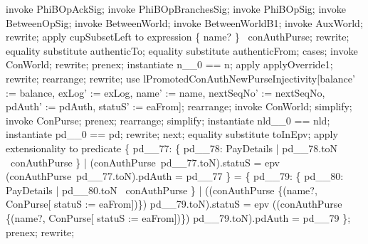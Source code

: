 \begin{LPScript}\begin{zproof}[lPromotedAuxWorldAckType]
    invoke PhiBOpAckSig;
    invoke PhiBOpBranchesSig;
    invoke PhiBOpSig;
    invoke BetweenOpSig;
    invoke BetweenWorld;
    invoke BetweenWorldB1;
    invoke AuxWorld;
    rewrite;
    apply cupSubsetLeft to expression \{ name? \} \cup \dom~conAuthPurse;
    rewrite;
    equality substitute authenticTo;
    equality substitute authenticFrom;
    cases;
        invoke ConWorld;
        rewrite;
        prenex;
        instantiate n\_\_0 == n;
        apply applyOverride1;
        rewrite;
        rearrange;
        rewrite;
        use lPromotedConAuthNewPurseInjectivity[balance' := balance,
            exLog' := exLog, name' := name, nextSeqNo' := nextSeqNo,
            pdAuth' := pdAuth, statuS' := eaFrom];
        rearrange;
        invoke ConWorld;
        simplify;
        invoke ConPurse;
        prenex;
        rearrange;
        simplify;
        instantiate nld\_\_0 == nld;
        instantiate pd\_\_0 == pd;
        rewrite;
    next;
        equality substitute toInEpv;
        apply extensionality to predicate
            \{ pd\_\_77: \{ pd\_\_78: PayDetails | pd\_\_78.toN \in \dom~conAuthPurse \}
              | (conAuthPurse~pd\_\_77.toN).statuS = epv
             \land (conAuthPurse~pd\_\_77.toN).pdAuth = pd\_\_77 \}
            = \{ pd\_\_79: \{ pd\_\_80: PayDetails | pd\_\_80.toN \in \dom~conAuthPurse \}
              | ((conAuthPurse \oplus \{(name?, \theta ConPurse[
                    statuS := eaFrom])\}) pd\_\_79.toN).statuS = epv
              \land ((conAuthPurse \oplus \{(name?, \theta ConPurse[
                    statuS := eaFrom])\}) pd\_\_79.toN).pdAuth = pd\_\_79 \};
        prenex;
        rewrite;

\end{zproof}
\end{LPScript}
